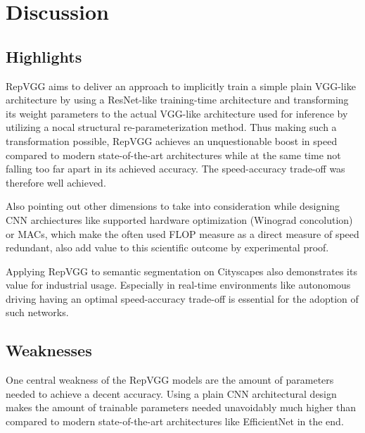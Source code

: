 \section{Discussion}

\subsection{Highlights}

RepVGG aims to deliver an approach to implicitly train a simple plain VGG-like architecture by using a ResNet-like training-time architecture and transforming its weight parameters to the actual VGG-like architecture used for inference by utilizing a nocal structural re-parameterization method. Thus making such a transformation possible, RepVGG achieves an unquestionable boost in speed compared to modern state-of-the-art architectures while at the same time not falling too far apart in its achieved accuracy. The speed-accuracy trade-off was therefore well achieved. 

Also pointing out other dimensions to take into consideration while designing CNN archiectures like supported hardware optimization (Winograd concolution) or MACs, which make the often used FLOP measure as a direct measure of speed redundant, also add value to this scientific outcome by experimental proof.

Applying RepVGG to semantic segmentation on Cityscapes also demonstrates its value for industrial usage. Especially in real-time environments like autonomous driving having an optimal speed-accuracy trade-off is essential for the adoption of such networks. 

\subsection{Weaknesses}

One central weakness of the RepVGG models are the amount of parameters needed to achieve a decent accuracy. Using a plain CNN architectural design makes the amount of trainable parameters needed unavoidably much higher than compared to modern state-of-the-art architectures like EfficientNet in the end.  

